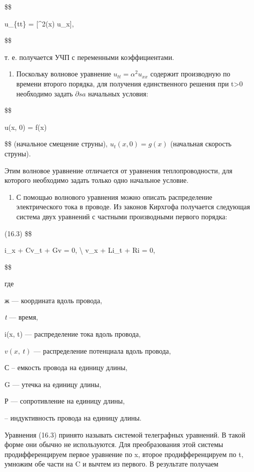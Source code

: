 \$\$

u\_\{tt\} =  {[}\alpha\^{}2(x) u\_x{]},

\$\$

т. е. получается УЧП с переменными коэффициентами.

\begin{enumerate}
\def\labelenumi{\arabic{enumi}.}
\setcounter{enumi}{2}
\tightlist
\item
  Поскольку волновое уравнение \(u_{tt} = \alpha^2 u_{xx}\) содержит производную по времени второго порядка, для получения единственного решения при t\textgreater0 необходимо задать \(\partial sa\) начальных условия:
\end{enumerate}

\$\$

u(x, 0) = f(x)

\$\$ (начальное смещение струны), \(u_t(x, 0) = g(x)\) (начальная скорость струны).

Этим волновое уравнение отличается от уравнения теплопроводности, для которого необходимо задать только одно начальное условие.

\begin{enumerate}
\def\labelenumi{\arabic{enumi}.}
\setcounter{enumi}{3}
\tightlist
\item
  С помощью волнового уравнения можно описать распределение электрического тока в проводе. Из законов Кирхгофа получается следующая система двух уравнений с частными производными первого порядка:
\end{enumerate}

(16.3) \$\$

i\_x + Cv\_t + Gv = 0, \textbackslash{} v\_x + Li\_t + Ri = 0,

\$\$

где

ж --- координата вдоль провода,

\emph{t} --- время,

i(x, t) --- распределение тока вдоль провода,

\(v\left(x,\ t\right)\) --- распределение потенциала вдоль провода,

С -- емкость провода на единицу длины,

G --- утечка на единицу длины,

Р --- сопротивление на единицу длины,

-- индуктивность провода на единицу длины.

Уравнения (16.3) принято называть системой телеграфных уравнений. В такой форме они обычно не используются. Для преобразования этой системы продифференцируем первое уравнение по x, второе продифференцируем по t, умножим обе части на C и вычтем из первого. В результате получаем

